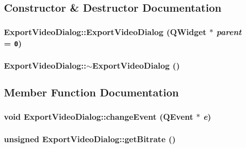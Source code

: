 \subsection{Constructor \& Destructor Documentation}
\hypertarget{class_export_video_dialog_d2268ac67b60a71671e50f400cc3ef61}{
\subsubsection[{ExportVideoDialog}]{\setlength{\rightskip}{0pt plus 5cm}ExportVideoDialog::ExportVideoDialog (QWidget $\ast$ {\em parent} = {\tt 0})}}
\label{class_export_video_dialog_d2268ac67b60a71671e50f400cc3ef61}


\hypertarget{class_export_video_dialog_6fb9e39694b0eed912c490483a8643e4}{
\subsubsection[{$\sim$ExportVideoDialog}]{\setlength{\rightskip}{0pt plus 5cm}ExportVideoDialog::$\sim$ExportVideoDialog ()}}
\label{class_export_video_dialog_6fb9e39694b0eed912c490483a8643e4}




\subsection{Member Function Documentation}
\hypertarget{class_export_video_dialog_c9ce9ba5ce74293d16b332f7847c9ed9}{
\subsubsection[{changeEvent}]{\setlength{\rightskip}{0pt plus 5cm}void ExportVideoDialog::changeEvent (QEvent $\ast$ {\em e})}}
\label{class_export_video_dialog_c9ce9ba5ce74293d16b332f7847c9ed9}


\hypertarget{class_export_video_dialog_3005ac15f33b801783bf8772e8ac4b8b}{
\subsubsection[{getBitrate}]{\setlength{\rightskip}{0pt plus 5cm}unsigned ExportVideoDialog::getBitrate ()}}
\label{class_export_video_dialog_3005ac15f33b801783bf8772e8ac4b8b}


